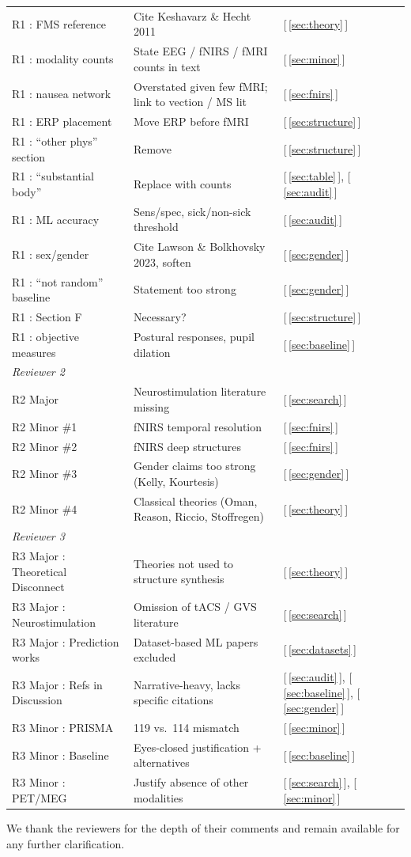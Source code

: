 \documentclass[11pt,a4paper]{article}
\newcommand{\xref}[1]{\textcolor{blue!50!black}{[\,#1\,]}}
\begin{document}
\begin{longtable}{p{} p{} p{}}
R1 : FMS reference & Cite Keshavarz \& Hecht 2011 & \xref{\ref{sec:theory}} \\
R1 : modality counts & State EEG / fNIRS / fMRI counts in text & \xref{\ref{sec:minor}} \\
R1 : nausea network & Overstated given few fMRI; link to vection / MS lit & \xref{\ref{sec:fnirs}} \\
R1 : ERP placement & Move ERP before fMRI & \xref{\ref{sec:structure}} \\
R1 : ``other phys'' section & Remove & \xref{\ref{sec:structure}} \\
R1 : ``substantial body'' & Replace with counts & \xref{\ref{sec:table}}, \xref{\ref{sec:audit}} \\
R1 : ML accuracy & Sens/spec, sick/non-sick threshold & \xref{\ref{sec:audit}} \\
R1 : sex/gender & Cite Lawson \& Bolkhovsky 2023, soften & \xref{\ref{sec:gender}} \\
R1 : ``not random'' baseline & Statement too strong & \xref{\ref{sec:gender}} \\
R1 : Section F & Necessary? & \xref{\ref{sec:structure}} \\
R1 : objective measures & Postural responses, pupil dilation & \xref{\ref{sec:baseline}} \\
\midrule
\multicolumn{3}{l}{\textit{Reviewer 2}}\\
R2 Major & Neurostimulation literature missing & \xref{\ref{sec:search}} \\
R2 Minor \#1 & fNIRS temporal resolution & \xref{\ref{sec:fnirs}} \\
R2 Minor \#2 & fNIRS deep structures & \xref{\ref{sec:fnirs}} \\
R2 Minor \#3 & Gender claims too strong (Kelly, Kourtesis) & \xref{\ref{sec:gender}} \\
R2 Minor \#4 & Classical theories (Oman, Reason, Riccio, Stoffregen) & \xref{\ref{sec:theory}} \\
\midrule
\multicolumn{3}{l}{\textit{Reviewer 3}}\\
R3 Major : Theoretical Disconnect & Theories not used to structure synthesis & \xref{\ref{sec:theory}} \\
R3 Major : Neurostimulation & Omission of tACS / GVS literature & \xref{\ref{sec:search}} \\
R3 Major : Prediction works & Dataset-based ML papers excluded & \xref{\ref{sec:datasets}} \\
R3 Major : Refs in Discussion & Narrative-heavy, lacks specific citations & \xref{\ref{sec:audit}}, \xref{\ref{sec:baseline}}, \xref{\ref{sec:gender}} \\
R3 Minor : PRISMA & 119 vs.\ 114 mismatch & \xref{\ref{sec:minor}} \\
R3 Minor : Baseline & Eyes-closed justification + alternatives & \xref{\ref{sec:baseline}} \\
R3 Minor : PET/MEG & Justify absence of other modalities & \xref{\ref{sec:search}}, \xref{\ref{sec:minor}} \\

\end{longtable}

\bigskip
\noindent We thank the reviewers for the depth of their comments and remain available for any further clarification.
\end{document}
